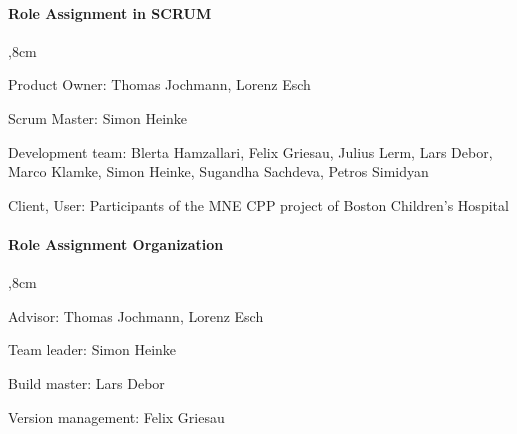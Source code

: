 \paragraph{Role Assignment in SCRUM}

\begin{aims}
	,8cm
	\item[Product Owner:] Thomas Jochmann, Lorenz Esch
	
	\item[Scrum Master:] Simon Heinke
	
	\item[Development team:] Blerta Hamzallari, Felix Griesau, Julius Lerm, Lars Debor, Marco Klamke, Simon Heinke, Sugandha Sachdeva, Petros Simidyan
	
	\item[Client, User:] Participants of the MNE CPP project of Boston Children's Hospital
	
\end{aims}

\paragraph{Role Assignment Organization}
\begin{aims}
	,8cm
	\item[Advisor:] Thomas Jochmann, Lorenz Esch
	
	\item[Team leader:] Simon Heinke
	
	\item[Build master:] Lars Debor
	
	\item[Version management:] Felix Griesau
	
\end{aims}

\clearpage